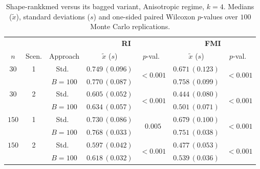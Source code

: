 \documentclass[11pt,a4paper]{article}
\begin{document}
\begin{table}[h]
\centering
\caption{Shape-rankkmed versus its bagged variant, Anisotropic regime, $k=4$. Medians ($\tilde x$), standard deviations ($s$) and one-sided paired Wilcoxon $p$-values over $100$ Monte Carlo replications.}
\label{tab:rkm-aniso-k4}
\footnotesize
\begin{tabular}{cc c cc cc}
\toprule
& & & \multicolumn{2}{c}{\textbf{RI}} & \multicolumn{2}{c}{\textbf{FMI}} \\
\cmidrule(lr){4-5}\cmidrule(lr){6-7}
$n$ & Scen. & Approach & $\tilde x$ ($s$) & $p$-val.\ & $\tilde x$ ($s$) & $p$-val.\ \\
\midrule
$30$ & 1 & Std.\ & $0.749\,(0.096)$ & \multirow{2}{*}{$\mathbf{<\!0.001}$} & $0.671\,(0.123)$ & \multirow{2}{*}{$\mathbf{<\!0.001}$} \\
     &   & $B{=}100$ & $0.770\,(0.087)$ & & $0.758\,(0.099)$ & \\
$30$ & 2 & Std.\ & $0.605\,(0.052)$ & \multirow{2}{*}{$\mathbf{<\!0.001}$} & $0.444\,(0.080)$ & \multirow{2}{*}{$\mathbf{<\!0.001}$} \\
     &   & $B{=}100$ & $0.634\,(0.057)$ & & $0.501\,(0.071)$ & \\
$150$ & 1 & Std.\ & $0.730\,(0.086)$ & \multirow{2}{*}{$\mathbf{0.005}$} & $0.679\,(0.100)$ & \multirow{2}{*}{$\mathbf{<\!0.001}$} \\
     &   & $B{=}100$ & $0.768\,(0.033)$ & & $0.751\,(0.038)$ & \\
$150$ & 2 & Std.\ & $0.597\,(0.042)$ & \multirow{2}{*}{$\mathbf{<\!0.001}$} & $0.477\,(0.053)$ & \multirow{2}{*}{$\mathbf{<\!0.001}$} \\
     &   & $B{=}100$ & $0.618\,(0.032)$ & & $0.539\,(0.036)$ & \\
\bottomrule
\end{tabular}
\end{table}
\end{document}

